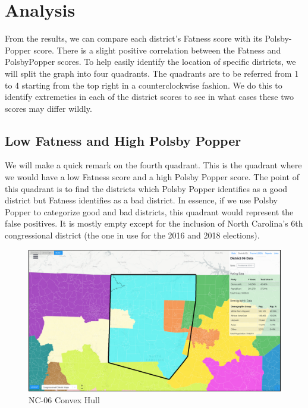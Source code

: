 \documentclass[letterpaper]{article}
\begin{document}
\section{Analysis}
From the results, we can compare each district's Fatness score with its Polsby-Popper score. There is a slight positive correlation between the Fatness and PolsbyPopper scores.
To help easily identify the location of specific districts, we will split the graph into four quadrants. The quadrants are to be referred from 1 to 4 starting from the top right in a counterclockwise fashion. We do this to identify extremeties in each of the district scores to see in what cases these two scores may differ wildly.

\subsection{Low Fatness and High Polsby Popper}
We will make a quick remark on the fourth quadrant. This is the quadrant where we would have a low Fatness score and a high Polsby Popper score. The point of this quadrant is to find the districts which Polsby Popper identifies as a good district but Fatness identifies as a bad district. In essence, if we use Polsby Popper to categorize good and bad districts, this quadrant would represent the false positives. It is mostly empty except for the inclusion of North Carolina's 6th congressional district (the one in use for the 2016 and 2018 elections).

\begin{figure}[H]
	\includegraphics[width=\linewidth]{./figures/NC-06-ConvexHull.png}
	\caption{NC-06 Convex Hull}
	\label{fig:nc06convexHull}
\end{figure}
\end{document}
